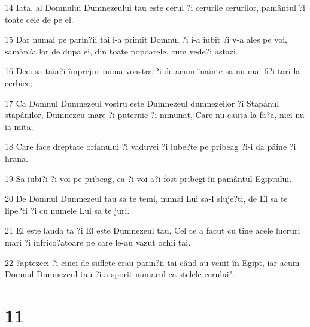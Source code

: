 \par 14 Iata, al Domnului Dumnezeului tau este cerul ?i cerurile cerurilor, pamântul ?i toate cele de pe el.
\par 15 Dar numai pe parin?ii tai i-a primit Domnul ?i i-a iubit ?i v-a ales pe voi, samân?a lor de dupa ei, din toate popoarele, cum vede?i astazi.
\par 16 Deci sa taia?i împrejur inima voastra ?i de acum înainte sa nu mai fi?i tari la cerbice;
\par 17 Ca Domnul Dumnezeul vostru este Dumnezeul dumnezeilor ?i Stapânul stapânilor, Dumnezeu mare ?i puternic ?i minunat, Care nu cauta la fa?a, nici nu ia mita;
\par 18 Care face dreptate orfanului ?i vaduvei ?i iube?te pe pribeag ?i-i da pâine ?i hrana.
\par 19 Sa iubi?i ?i voi pe pribeag, ca ?i voi a?i fost pribegi în pamântul Egiptului.
\par 20 De Domnul Dumnezeul tau sa te temi, numai Lui sa-I sluje?ti, de El sa te lipe?ti ?i cu numele Lui sa te juri.
\par 21 El este lauda ta ?i El este Dumnezeul tau, Cel ce a facut cu tine acele lucruri mari ?i înfrico?atoare pe care le-au vazut ochii tai.
\par 22 ?aptezeci ?i cinci de suflete erau parin?ii tai când au venit în Egipt, iar acum Domnul Dumnezeul tau ?i-a sporit numarul ca stelele cerului".

\chapter{11}

